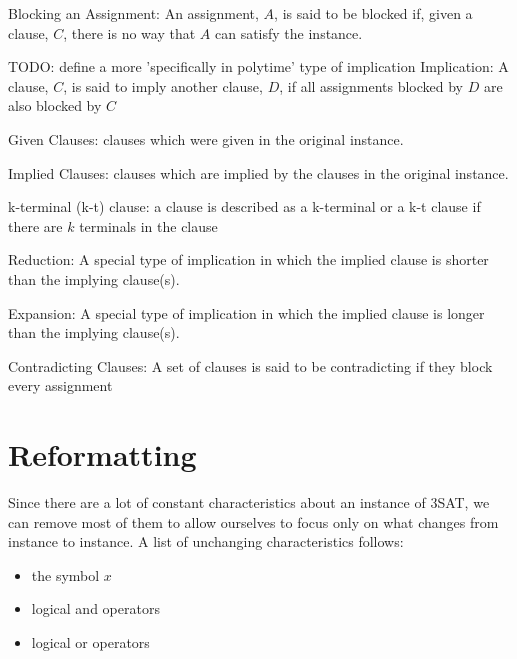\documentclass[manuscript]{acmart}
\begin{document}
    \begin{definition}
        Blocking an Assignment: An assignment, $A$, is said to be blocked if, given a
        clause, $C$, there is no way that $A$ can satisfy the instance.
    \end{definition}
    \begin{definition}
        TODO: define a more 'specifically in polytime' type of implication
        Implication: A clause, $C$, is said to imply another clause, $D$, if all 
        assignments blocked by $D$ are also blocked by $C$ 
    \end{definition}
    \begin{definition}
        Given Clauses: clauses which were given in the original instance.
    \end{definition}
    \begin{definition}
        Implied Clauses: clauses which are implied by the clauses in the original instance.
    \end{definition}
    \begin{definition}
        k-terminal (k-t) clause: a clause is described as a k-terminal or a k-t clause
        if there are $k$ terminals in the clause
    \end{definition}
    \begin{definition}
        Reduction: A special type of implication in which the implied 
        clause is shorter than the implying clause(s).
    \end{definition}
    \begin{definition}
        Expansion: A special type of implication in which the 
        implied clause is longer than the implying clause(s).
    \end{definition}
    \begin{definition}
        Contradicting Clauses: A set of clauses is said to be contradicting if
        they block every assignment
    \end{definition}

    \section{Reformatting}

    Since there are a lot of constant characteristics about an instance of 3SAT, 
    we can remove most of them to allow ourselves to focus only on what changes
    from instance to instance. A list of unchanging characteristics follows:
    \begin{itemize}
        \item the symbol $x$
        \item logical and operators
        \item logical or operators
    \end{itemize}
    
\end{document}
